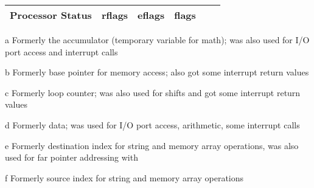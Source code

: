 \begin{table*}
\begin{threeparttable}
\begin{tabular}{lAAAAA}
      Processor Status & rflags & eflags & flags && \\
      \bottomrule
    \end{tabular}
    \begin{tablenotes}
      \item[a] Formerly the accumulator (temporary variable for math);%
        was also used for I/O port access and interrupt calls
      \item[b] Formerly base pointer for memory access;%
        also got some interrupt return values
      \item[c] Formerly loop counter;%
        was also used for shifts and got some interrupt return values
      \item[d] Formerly data;%
        was used for I/O port access, arithmetic, some interrupt calls
      \item[e] Formerly destination index for string and memory array operations,
        was also used for far pointer addressing with 
      \item[f] Formerly source index for string and memory array operations
    \end{tablenotes}
  \end{threeparttable}
\end{table*}

